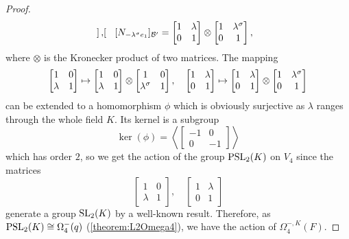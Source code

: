 \begin{proof}
\begin{equation*}
\begin{bmatrix}
		\end{bmatrix},\quad
		[N_{-\lambda^{\sigma} e_1}]_{\mathcal{B}'} = \begin{bmatrix}
			1 & \lambda \\
			0 & 1
		\end{bmatrix} \otimes
		\begin{bmatrix}
			1 & \lambda^{\sigma} \\
			0 & 1
		\end{bmatrix},
	\end{equation*}
	where $\otimes$ is the Kronecker product of two matrices. The mapping
	\begin{equation*}
		\begin{bmatrix}
			1 & 0 \\
			\lambda & 1 
		\end{bmatrix} \mapsto
		\begin{bmatrix}
			1 & 0 \\
			\lambda & 1
		\end{bmatrix} \otimes
		\begin{bmatrix}
			1 & 0 \\
			\lambda^{\sigma} & 1
		\end{bmatrix},\quad 
		\begin{bmatrix}
			1 & \lambda \\
			0 & 1
		\end{bmatrix} \mapsto
		\begin{bmatrix}
			1 & \lambda \\
			0 & 1
		\end{bmatrix} \otimes
		\begin{bmatrix}
			1 & \lambda^{\sigma} \\
			0 & 1
		\end{bmatrix}
	\end{equation*}
	can be extended to a homomorphism $\phi$ which is obviously surjective as $\lambda$
	 ranges
	through the whole field $K$. Its kernel is a subgroup
	\begin{equation*}
		\ker(\phi) = 
		\left\langle
			\begin{bmatrix}
				-1 & 0 \\
				0 & -1
			\end{bmatrix}
		\right\rangle
	\end{equation*}
	which has order $2$, so we get the action of the group $\mathrm{PSL}_2(K)$ on $V_4$ since
	the matrices
	\begin{equation*}
		\begin{bmatrix}
			1 & 0 \\
			\lambda & 1
		\end{bmatrix},\quad
		\begin{bmatrix}
			1 & \lambda \\
			0 & 1 
		\end{bmatrix}
	\end{equation*}
	generate a group $\mathrm{SL}_2(K)$ by a well-known result.
	Therefore, as $\mathrm{PSL}_2(K) \cong \Omega_4^-(q)$ (\ref{theorem:L2Omega4}), 
	we have the action of $\Omega_4^{-,K}(F)$. 
\end{proof}

